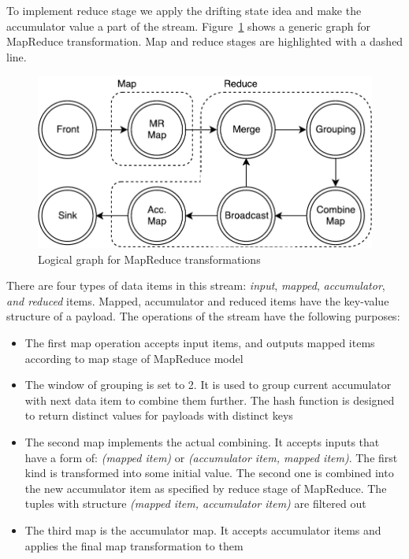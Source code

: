 To implement reduce stage we apply the drifting state idea and make the accumulator value a part of the stream. Figure~\ref{mapreduce-graph-figure} shows a generic graph for MapReduce transformation. Map and reduce stages are highlighted with a dashed line. 

\begin{figure}[htb]
  \centering
  \includegraphics[scale=0.5]{pics/mapreduce}
  \caption{Logical graph for MapReduce transformations}
  \label {mapreduce-graph-figure}
\end{figure}

There are four types of data items in this stream: {\it input}, {\it mapped}, {\it accumulator}, {\it and reduced} items. Mapped, accumulator and reduced items have the key-value structure of a payload. The operations of the stream have the following purposes:

\begin{itemize}
  \item The first map operation accepts input items, and outputs mapped items according to map stage of MapReduce model
  \item The window of grouping is set to 2. It is used to group current accumulator with next data item to combine them further. The hash function is designed to return distinct values for payloads with distinct keys
  \item The second map implements the actual combining. It accepts inputs that have a form of: \textit{(mapped item)} or \textit{(accumulator item, mapped item)}. The first kind is transformed into some initial value. The second one is combined into the new accumulator item as specified by reduce stage of MapReduce. The tuples with structure \textit{(mapped item, accumulator item)} are filtered out
  \item The third map is the accumulator map. It accepts accumulator items and applies the final map transformation to them
\end{itemize}

